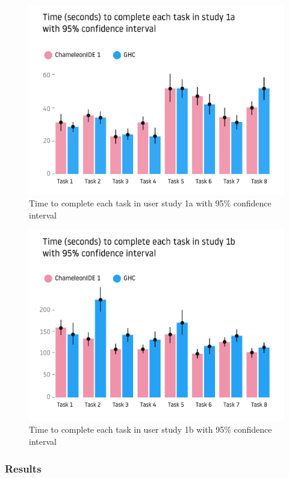 \begin{figure}[h]
    \centering
    \includegraphics[width=\linewidth]{images/user-study-1a.pdf}
    \caption{Time to complete each task in user study 1a with 95\% confidence interval}
    \label{fig:analysis-1a}
\end{figure}


\begin{figure}[h]
    \centering
    \includegraphics[width=\linewidth]{images/user-study-1b.pdf}
    \caption{Time to complete each task in user study 1b with 95\% confidence interval}
    \label{fig:analysis-1b}
\end{figure}

\subsubsection*{\textbf {Results}}

